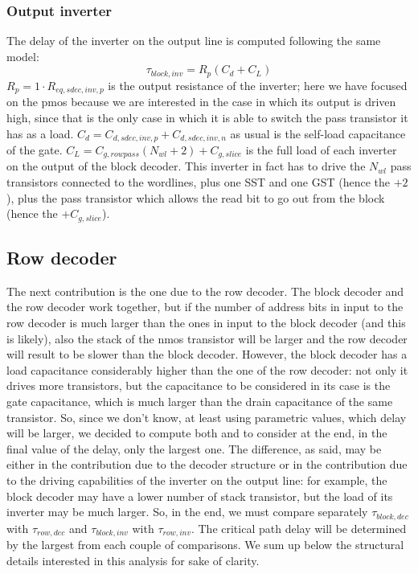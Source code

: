 \subsubsection{Output inverter}
The delay of the inverter on the output line is computed following the same model: 
$$\tau_{block,inv}=R_p(C_d+C_L)$$
$R_p=1\cdot R_{eq,sdec,inv,p}$ is the output resistance of the inverter; here we have focused on the pmos because we are interested in the case in which its output is driven high, since that is the only case in which it is able to switch the pass transistor it has as a load. $C_d=C_{d,sdec,inv,p}+C_{d,sdec,inv,n}$ as usual is the self-load capacitance of the gate. $C_L=C_{g,rowpass}(N_{wl}+2)+C_{g,slice}$ is the full load of each inverter on the output of the block decoder. This inverter in fact has to drive the $N_{wl}$ pass transistors connected to the wordlines, plus one SST and one GST (hence the $+2$), plus the pass transistor which allows the read bit to go out from the block (hence the $+C_{g,slice}$).

\subsection{Row decoder}
The next contribution is the one due to the row decoder. The block decoder and the row decoder work together, but if the number of address bits in input to the row decoder is much larger than the ones in input to the block decoder (and this is likely), also the stack of the nmos transistor will be larger and the row decoder will result to be slower than the block decoder. However, the block decoder has a load capacitance considerably higher than the one of the row decoder: not only it drives more transistors, but the capacitance to be considered in its case is the gate capacitance, which is much larger than the drain capacitance of the same transistor. So, since we don't know, at least using parametric values, which delay will be larger, we decided to compute both and to consider at the end, in the final value of the delay, only the largest one. The difference, as said, may be either in the contribution due to the decoder structure or in the contribution due to the driving capabilities of the inverter on the output line: for example, the block decoder may have a lower number of stack transistor, but the load of its inverter may be much larger. So, in the end, we must compare separately $\tau_{block,dec}$ with $\tau_{row,dec}$ and $\tau_{block,inv}$ with $\tau_{row,inv}$. The critical path delay will be determined by the largest from each couple of comparisons. We sum up below the structural details interested in this analysis for sake of clarity.

